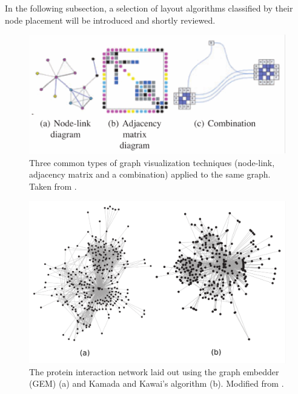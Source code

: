 In the following subsection, a selection of layout algorithms classified by their node placement will be introduced and shortly reviewed.
\begin{figure}
    \centering
    \includegraphics[width=\linewidth]{media/vis_types.pdf}
    \caption{Three common types of graph visualization techniques (node-link, adjacency matrix and a combination) applied to the same graph. Taken from \cite{VonLandesberger2011}.}
    \label{fig:vis_types}
\end{figure}

\begin{figure}
    \centering
    \includegraphics[scale=0.16]{media/layout_techniques.pdf}
    \caption{The protein interaction network laid out using the graph embedder (GEM) (a) and Kamada and Kawai's algorithm (b). Modified from \cite{Gibson2013}.}
    \label{fig:layout_techniques}
\end{figure}
